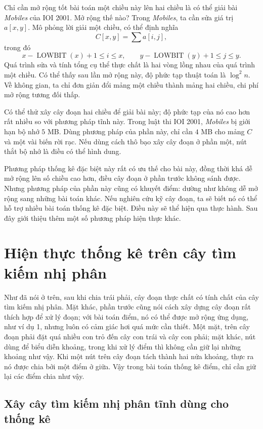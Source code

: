 \documentclass[11pt]{article}
\begin{document}
Chỉ cần mở rộng tốt bài toán một chiều này lên hai chiều là có thể giải bài
\textit{Mobiles} của IOI 2001. Mở rộng thế nào? Trong \textit{Mobiles}, ta
cần sửa giá trị \(a[x,y]\). Mô phỏng lời giải một chiều, có thể định nghĩa
\[
  C[x,y]=\sum a[i,j],
\]
trong đó
\[
  x-\operatorname{LOWBIT}(x)+1\le i\le x,\qquad
  y-\operatorname{LOWBIT}(y)+1\le j\le y.
\]
Quá trình sửa và tính tổng cụ thể thực chất là hai vòng lồng nhau của quá
trình một chiều. Có thể thấy sau lần mở rộng này, độ phức tạp thuật toán là
\(\log^2 n\). Về không gian, ta chỉ đơn giản đổi mảng một chiều thành mảng
hai chiều, chi phí mở rộng tương đối thấp.

Có thể thử xây cây đoạn hai chiều để giải bài này; độ phức tạp của nó cao hơn
rất nhiều so với phương pháp tĩnh này. Trong luật thi IOI 2001,
\textit{Mobiles} bị giới hạn bộ nhớ \(5\) MB. Dùng phương pháp của phần này,
chỉ cần \(4\) MB cho mảng \(C\) và một vài biến rời rạc. Nếu dùng cách thô
bạo xây cây đoạn ở phần một, nút thắt bộ nhớ là điều có thể hình dung.

Phương pháp thống kê đặc biệt này rất có ưu thế cho bài này, đồng thời khá dễ
mở rộng lên số chiều cao hơn, điều cây đoạn ở phần trước không sánh được.
Nhưng phương pháp của phần này cũng có khuyết điểm: dường như không dễ mở
rộng sang những bài toán khác. Nếu nghiên cứu kỹ cây đoạn, ta sẽ biết nó có
thể hỗ trợ nhiều bài toán thống kê đặc biệt. Điều này sẽ thể hiện qua thực
hành. Sau đây giới thiệu thêm một số phương pháp hiện thực khác.

\section{Hiện thực thống kê trên cây tìm kiếm nhị phân}

Như đã nói ở trên, sau khi chia trái phải, cây đoạn thực chất có tính chất của
cây tìm kiếm nhị phân. Mặt khác, phần trước cũng nói cách xây dựng cây đoạn
rất thích hợp để xử lý đoạn; với bài toán điểm, nó có thể được mở rộng ứng
dụng, như ví dụ 1, nhưng luôn có cảm giác hơi quá mức cần thiết. Một mặt,
trên cây đoạn phải đặt quá nhiều con trỏ đến cây con trái và cây con phải; mặt
khác, nút dùng để biểu diễn khoảng, trong khi xử lý điểm thì không cần giữ lại
những khoảng như vậy. Khi một nút trên cây đoạn tách thành hai nửa khoảng,
thực ra nó được chia bởi một điểm ở giữa. Vậy trong bài toán thống kê điểm,
chỉ cần giữ lại các điểm chia như vậy.

\subsection{Xây cây tìm kiếm nhị phân tĩnh dùng cho thống kê}
\end{document}
